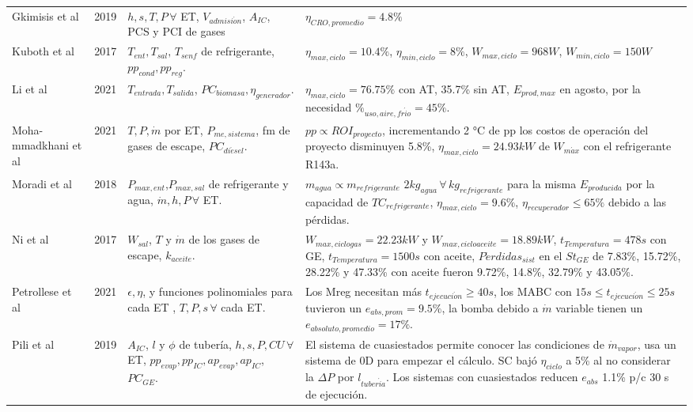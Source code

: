 {\begin{footnotesize}
\begin{longtable}[H]{p{1.5cm}p{0.5cm}p{4cm}p{9.3cm}}
        Gkimisis et al & 2019 &
        $h,s,T,P \, \forall $ ET, $V_{admisi\acute{o}n}$, $A_{IC}$, PCS y PCI de gases &
        $\eta_{CRO,promedio}= 4.8\%$ \\
        Kuboth et al & 2017 & 
        $T_{ent},T_{sal}, \, T_{senf}$ de refrigerante, $pp_{cond},pp_{reg}$. &
        $\eta_{max,ciclo}=10.4\%$, $\eta_{min,ciclo}=8\%$, $W_{max,ciclo}=968 W$, $W_{min,ciclo}=150 W$ \\
        Li et al & 2021 & 
        $T_{entrada},T_{salida}$, $PC_{biomasa},\eta_{generador}$. &
        $\eta_{max,ciclo}=76.75\%$ con AT, 35.7\% sin AT, $E_{prod,max}$ en agosto, por la necesidad $\%_{uso,aire,fr\acute{i}o}=45\%$. \\
        Moha- mmadkhani et al & 2021 &
        $T,P,\dot{m} $ por ET, $P_{me,sistema}$, fm de gases de escape, $PC_{di\acute{e}sel}$. & 
        $pp \propto ROI_{proyecto}$, incrementando 2 °C de pp los costos de operación del proyecto disminuyen 5.8\%, $\eta_{max,ciclo}=24.93 kW$ de $W_{m\acute{a}x}$ con el refrigerante R143a. \\
        Moradi et al & 2018 &
        $P_{max,ent}$,$P_{max,sal}$ de refrigerante y agua, $\dot{m},h,P\,\forall$ ET. &
        $m_{agua} \propto m_{refrigerante}$ $2 kg_{agua}\, \forall \, kg_{refrigerante}$ para la misma $E_{producida}$ por la capacidad de $TC_{refrigerante}$, $\eta_{max,ciclo}=9.6\%$, $\eta_{recuperador} \leq 65\%$ debido a las pérdidas. \\
        Ni et al & 2017 &
        $W_{sal}$, $T$ y $\dot{m}$ de los gases de escape, $k_{aceite}$. &
        $W_{max,ciclo gas}=22.23 kW$ y $W_{max,ciclo aceite}=18.89 kW$, $t_{Temperatura}=478 s$ con GE, $t_{Temperatura}=1500s$ con aceite, $P\acute{e}rdidas_{sist}$ en el $St_{GE}$ de 7.83\%,  15.72\%, 28.22\% y 47.33\% con aceite fueron  9.72\%, 14.8\%, 32.79\% y 43.05\%. \\
        Petrollese et al & 2021 &
        $\epsilon,\eta$, y funciones polinomiales para cada ET , $T,P,s\,\forall$ cada ET.  &
        Los Mreg necesitan más $t_{ejecuci\acute{o}n}\geq40s$, los MABC con $15s\leq t_{ejecuci\acute{o}n}\leq 25s$ tuvieron un $e_{abs,prom}= 9.5\%$, la bomba debido a $\dot{m}$ variable tienen un $e_{absoluto,promedio}= 17\%$. \\
        Pili et al & 2019 &
        $A_{IC}$, $l$ y $\phi$ de tubería, $h,s,P,CU\,\forall$ ET, $pp_{evap},pp_{IC},ap_{evap},ap_{IC}$, $PC_{GE}$. & 
        El sistema de cuasiestados permite conocer las condiciones de $\dot{m}_{vapor}$, usa un sistema de 0D para empezar el cálculo. SC bajó $\eta_{ciclo}$ a 5\% al no considerar la $\Delta P$ por $l_{tuber\acute{i}a}$. Los sistemas con cuasiestados reducen $e_{abs}$ 1.1\% p/c 30 s de ejecución. \\

\end{longtable}
\end{footnotesize}}
